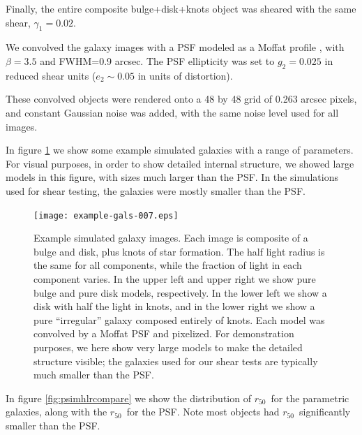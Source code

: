 \documentclass[iop]{emulateapj}
\newcommand{\hlr}{$r_{50}$}
\begin{document}
Finally, the entire composite bulge+disk+knots object was sheared with the same
shear, $\gamma_1=0.02$.

We convolved the galaxy images with a PSF modeled as a Moffat profile
\citep{Moffat1969}, with $\beta=3.5$ and FWHM=0.9 arcsec. The PSF ellipticity was set to $g_2 = 0.025$ in reduced shear units ($e_2 \sim 
0.05$ in units of distortion). 

These convolved objects were rendered onto a 48 by 48 grid of 0.263 arcsec
pixels, and constant Gaussian noise was added, with the same noise level used
for all images.

In figure \ref{fig:parametricgals} we show some example simulated galaxies with
a range of parameters.  For visual purposes, in order to show detailed internal
structure, we showed large models in this figure, with sizes much larger than
the PSF.  In the simulations used for shear testing, the galaxies were mostly
smaller than the PSF.


\begin{figure}[p]
    \centering
    \texttt{[image: example-gals-007.eps]}

    \caption{Example simulated galaxy images.  Each image is composite of a
    bulge and disk, plus knots of star formation.  The half light radius is the
    same for all components, while the fraction of light in each component
    varies.  In the upper left and upper right we show pure bulge and pure disk
    models, respectively.  In the lower left we show a disk with half the light
    in knots, and in the lower right we show a pure ``irregular'' galaxy
    composed entirely of knots.  Each model was convolved by a Moffat PSF
	and pixelized.  For demonstration purposes, we here show very
    large models to make the detailed structure visible; the galaxies used for
    our shear tests are typically much smaller than the PSF. }

	\label{fig:parametricgals}

\end{figure}

In figure \ref{fig:psimhlrcompare} we show the distribution of \hlr\ for the
parametric galaxies, along with the \hlr\ for the PSF.  Note most objects had
\hlr\ significantly smaller than the PSF.
\end{document}
